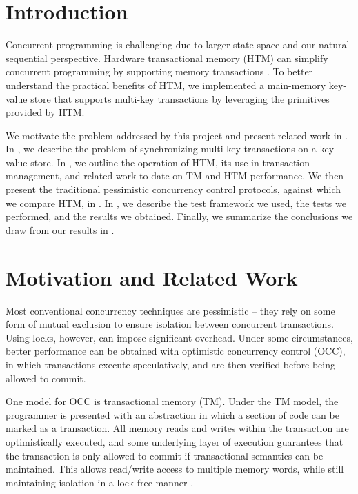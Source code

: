 \section{Introduction} \label{sec:intro}


Concurrent programming is challenging due to larger state space and our natural  
sequential perspective. Hardware transactional memory (HTM) can  
simplify concurrent programming by supporting memory transactions \citep{tm}. 
To better understand the practical benefits of HTM, we implemented a main-memory 
key-value store that supports multi-key transactions by leveraging the 
primitives provided by HTM. 

We motivate the problem addressed by this project and present related work in
.
In , we describe the problem of synchronizing multi-key
transactions on a key-value store. In , we outline the operation of
HTM, its use in transaction management, and related work to date on TM and HTM
performance. We then present the traditional pessimistic concurrency control
protocols, against which we compare HTM, in  . In
, we describe the test framework we used, the tests we performed,
and the results we obtained. Finally, we summarize the conclusions we draw from
our results in .

\section{Motivation and Related Work} \label{sec:related}

Most conventional concurrency techniques are pessimistic -- they rely on some
form of mutual exclusion to ensure isolation between concurrent
transactions. Using locks, however, can impose significant overhead. Under some
circumstances, better performance can be obtained with optimistic concurrency
control (OCC), in which transactions execute speculatively, and are then
verified before being allowed to commit.

One model for OCC is transactional memory (TM). Under the TM model, the
programmer is presented with an abstraction in which a section of code can be
marked as a transaction. All memory reads and writes within the transaction are
optimistically executed, and some underlying layer of execution guarantees that
the transaction is only allowed to commit if transactional semantics can be
maintained. This allows read/write access to multiple memory words, while still
maintaining isolation in a lock-free manner \citep{Herlihy93}.

